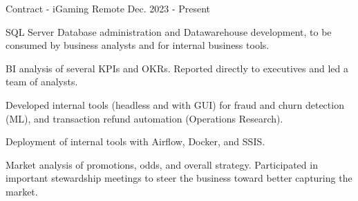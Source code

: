 

\begin{cventries}

	{Contract {-} iGaming} %
	{Remote} %
	{Dec. 2023 {-} Present} %
	{
		\begin{cvitems} %
			\item {SQL Server Database administration and Datawarehouse development, to be consumed by business analysts and for internal business tools.}
			\item {BI analysis of several KPIs and OKRs. Reported directly to executives and led a team of analysts.}
			\item {Developed internal tools (headless and with GUI) for fraud and churn detection (ML), and transaction refund automation (Operations Research).}
			\item {Deployment of internal tools with Airflow, Docker, and SSIS.}
			\item {Market analysis of promotions, odds, and overall strategy. Participated in important stewardship meetings to steer the business toward better capturing the market.}
		\end{cvitems}
	}


\end{cventries}
